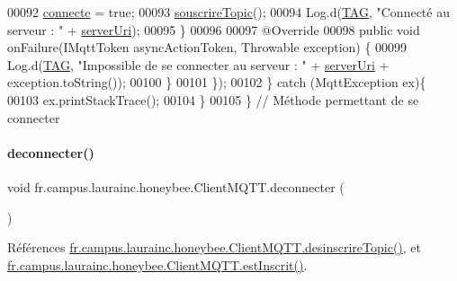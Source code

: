 \begin{DoxyCode}
00092                     \hyperlink{classfr_1_1campus_1_1laurainc_1_1honeybee_1_1_client_m_q_t_t_abf92ba9ac98a707353748665a738c1c0}{connecte} = \textcolor{keyword}{true};
00093                     \hyperlink{classfr_1_1campus_1_1laurainc_1_1honeybee_1_1_client_m_q_t_t_a4c5ae1bb188b2f3c770ab6112b7d8590}{souscrireTopic}();
00094                     Log.d(\hyperlink{classfr_1_1campus_1_1laurainc_1_1honeybee_1_1_client_m_q_t_t_a378324f705f8d7870c5f7be0cea02890}{TAG}, \textcolor{stringliteral}{"Connecté au serveur : "} + \hyperlink{classfr_1_1campus_1_1laurainc_1_1honeybee_1_1_client_m_q_t_t_acc6543bf073de1b41fae396d8c0cf83d}{serverUri});
00095                 \}
00096 
00097                 @Override
00098                 \textcolor{keyword}{public} \textcolor{keywordtype}{void} onFailure(IMqttToken asyncActionToken, Throwable exception) \{
00099                     Log.d(\hyperlink{classfr_1_1campus_1_1laurainc_1_1honeybee_1_1_client_m_q_t_t_a378324f705f8d7870c5f7be0cea02890}{TAG}, \textcolor{stringliteral}{"Impossible de se connecter au serveur : "} + 
      \hyperlink{classfr_1_1campus_1_1laurainc_1_1honeybee_1_1_client_m_q_t_t_acc6543bf073de1b41fae396d8c0cf83d}{serverUri} + exception.toString());
00100                 \}
00101             \});
00102         \} \textcolor{keywordflow}{catch} (MqttException ex)\{
00103             ex.printStackTrace();
00104         \}
00105     \} \textcolor{comment}{// Méthode permettant de se connecter}
\end{DoxyCode}
\mbox{\label{classfr_1_1campus_1_1laurainc_1_1honeybee_1_1_client_m_q_t_t_af067ec55e00ec18a14e248279872242f}} 
\paragraph{\texorpdfstring{deconnecter()}{deconnecter()}}
{\footnotesize\ttfamily void fr.\+campus.\+laurainc.\+honeybee.\+Client\+M\+Q\+T\+T.\+deconnecter (\begin{DoxyParamCaption}{ }\end{DoxyParamCaption})}



Références \hyperlink{classfr_1_1campus_1_1laurainc_1_1honeybee_1_1_client_m_q_t_t_aad5d88947bbdb3b83d4bf915985947e3}{fr.\+campus.\+laurainc.\+honeybee.\+Client\+M\+Q\+T\+T.\+desinscrire\+Topic()}, et \hyperlink{classfr_1_1campus_1_1laurainc_1_1honeybee_1_1_client_m_q_t_t_a8ec5abba65d09f44e1c2c8f9ef652632}{fr.\+campus.\+laurainc.\+honeybee.\+Client\+M\+Q\+T\+T.\+est\+Inscrit()}.



